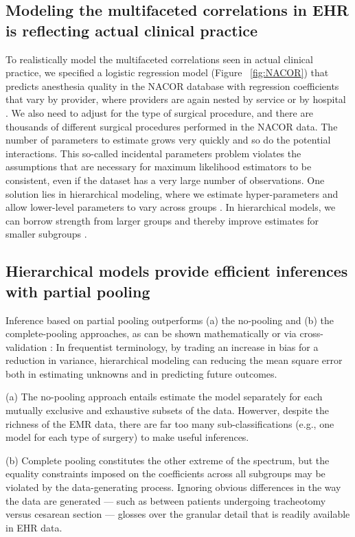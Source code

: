 \documentclass[11pt,notitlepage]{article}
\begin{document}
\subsection*{Modeling the multifaceted correlations in EHR is reflecting actual clinical practice}
To realistically model the multifaceted correlations seen in actual clinical 
practice, we specified a logistic regression model  (Figure~ \ref{fig:NACOR}) 
that predicts anesthesia quality in the NACOR database
with regression coefficients that vary by provider, where providers 
are again nested by service or by hospital 
\cite{AndreaeWhite2015}. We also need to adjust for the type of surgical procedure, and there are 
thousands of different surgical procedures performed in the NACOR data. The number 
of parameters to estimate grows very quickly and so do the potential interactions. This so-called
incidental parameters problem violates the assumptions that are necessary for maximum likelihood
estimators to be consistent, even if the dataset has a very large number of observations.
One solution lies in hierarchical modeling, where we estimate hyper-parameters and allow
lower-level parameters to vary across groups \cite{Bafumi_Gelman_2007}. 
In hierarchical models, we can borrow strength from larger groups and thereby improve estimates for 
smaller subgroups \cite{ParkGelman2004bayesian}.

\subsection*{Hierarchical models provide efficient inferences with partial pooling}
Inference based on partial pooling outperforms (a) the no-pooling and (b) the 
complete-pooling approaches, as can be shown mathematically \cite{Efron_1975} 
or via cross-validation \cite{Gelman-Hill_2014}: In frequentist terminology, by trading an increase in 
bias for a reduction in variance, hierarchical modeling can reducing the mean square error both
in estimating unknowns and in predicting future outcomes.

(a) The no-pooling approach entails estimate the model separately for each mutually exclusive and
exhaustive subsets of the data. Howerver, despite the richness of the EMR data, there are far too many 
sub-classifications (e.g., one model for each type of surgery) to make useful inferences.

(b) Complete pooling constitutes the other extreme of the spectrum, but the equality constraints 
imposed on the coefficients across all subgroups may be violated by the data-generating process. 
Ignoring obvious differences in the way the data are generated --- such 
as between patients undergoing tracheotomy versus cesarean section --- glosses
over the granular detail that is readily available in EHR data.
\end{document}
